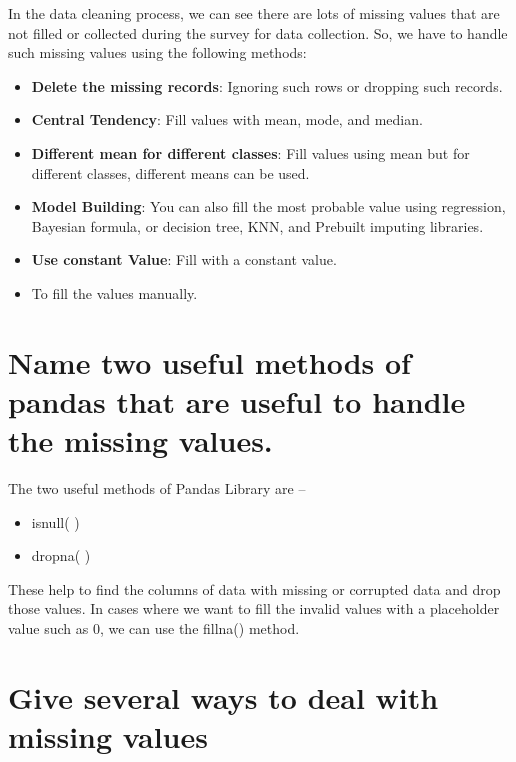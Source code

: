 \documentclass[
]{book}
\begin{document}
In the data cleaning process, we can see there are lots of missing values that are not filled or collected during the survey for data collection. So, we have to handle such missing values using the following methods:

\begin{itemize}
\item
  \textbf{Delete the missing records}: Ignoring such rows or dropping such records.
\item
  \textbf{Central Tendency}: Fill values with mean, mode, and median.
\item
  \textbf{Different mean for different classes}: Fill values using mean but for different classes, different means can be used.
\item
  \textbf{Model Building}: You can also fill the most probable value using regression, Bayesian formula, or decision tree, KNN, and Prebuilt imputing libraries.
\item
  \textbf{Use constant Value}: Fill with a constant value.
\item
  To fill the values manually.
\end{itemize}

\hypertarget{name-two-useful-methods-of-pandas-that-are-useful-to-handle-the-missing-values.}{%
\section{Name two useful methods of pandas that are useful to handle the missing values.}\label{name-two-useful-methods-of-pandas-that-are-useful-to-handle-the-missing-values.}}

The two useful methods of Pandas Library are --

\begin{itemize}
\item
  isnull( )
\item
  dropna( )
\end{itemize}

These help to find the columns of data with missing or corrupted data and drop those values. In cases where we want to fill the invalid values with a placeholder value such as 0, we can use the fillna() method.

\hypertarget{give-several-ways-to-deal-with-missing-values}{%
\section{Give several ways to deal with missing values}\label{give-several-ways-to-deal-with-missing-values}}
\end{document}

